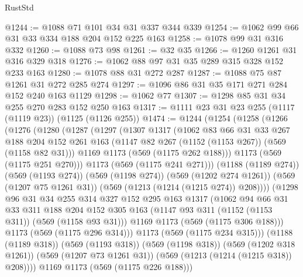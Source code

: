\begin{lexlean}{RustStd}
\begin{coremodule}
@1244 := @1088 @71 @101 @34 @31 @337 @344 @339
@1254 := @1062 @99 @66 @31 @33 @334 @188 @204 @152 @225 @163
@1258 := @1078 @99 @31 @316 @332
@1260 := @1088 @73 @98
@1261 := @32 @35
@1266 := @1260 @1261 @31 @316 @329 @318
@1276 := @1062 @88 @97 @31 @35 @289 @315 @328 @152 @233 @163
@1280 := @1078 @88 @31 @272 @287
@1287 := @1088 @75 @87 @1261 @31 @272 @285 @274
@1297 := @1096 @86 @31 @35 @171 @271 @284 @152 @240 @163 @1129
@1298 := @1062 @77
@1307 := @1298 @85 @31 @34 @255 @270 @283 @152 @250 @163
@1317 := @1111 @23 @31 @23 @255 (@1117 (@1119 @23)) (@1125 (@1126 @255))
@1474 := @1244
    (@1254
      (@1258
        (@1266
          (@1276
            (@1280
              (@1287
                (@1297
                  (@1307
                    @1317
                    (@1062
                      @83
                      @66
                      @31
                      @33
                      @267
                      @188
                      @204
                      @152
                      @261
                      @163
                      (@1147 @82 @267 (@1152 (@1153 @267)) (@569 (@1158 @82 @31)))
                      @1169
                      @1173
                      (@569 (@1175 @262 @188)))
                    @1173
                    (@569 (@1175 @251 @270)))
                  @1173
                  (@569 (@1175 @241 @271)))
                (@1188 (@1189 @274))
                (@569 (@1193 @274))
                (@569 (@1198 @274))
                (@569 (@1202 @274 @1261))
                (@569 (@1207 @75 @1261 @31))
                (@569 (@1213 (@1214 (@1215 @274)) @208))))
            (@1298
              @96
              @31
              @34
              @255
              @314
              @327
              @152
              @295
              @163
              @1317
              (@1062
                @94
                @66
                @31
                @33
                @311
                @188
                @204
                @152
                @305
                @163
                (@1147 @93 @311 (@1152 (@1153 @311)) (@569 (@1158 @93 @31)))
                @1169
                @1173
                (@569 (@1175 @306 @188)))
              @1173
              (@569 (@1175 @296 @314)))
            @1173
            (@569 (@1175 @234 @315)))
          (@1188 (@1189 @318))
          (@569 (@1193 @318))
          (@569 (@1198 @318))
          (@569 (@1202 @318 @1261))
          (@569 (@1207 @73 @1261 @31))
          (@569 (@1213 (@1214 (@1215 @318)) @208))))
      @1169
      @1173
      (@569 (@1175 @226 @188)))

\end{coremodule}
\end{lexlean}
